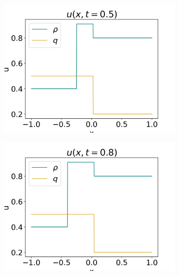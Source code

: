 \documentclass[10pt]{article}
\numberwithin{equation}{section}
\begin{document}
\begin{figure}
\begin{subfigure}[t]{0.2\textwidth}
         \includegraphics[width=\textwidth]{Figures/Model/Plots/SysContactsAtTime5.png}
     \end{subfigure}
     \begin{subfigure}[t]{0.2\textwidth}
         \centering
         \includegraphics[width=\textwidth]{Figures/Model/Plots/SysContactsAtTime8.png}
     \end{subfigure}
     \\
     \begin{subfigure}[b]{0.35\textwidth}
         \centering

\end{subfigure}
\end{figure}
\end{document}
